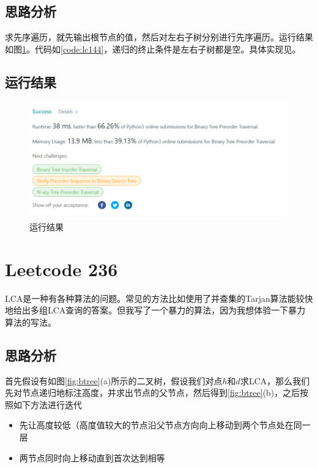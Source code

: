 \documentclass[a4paper,twoside]{article}
\begin{document}
\begin{spacing}{1.2}
\subsection{思路分析}

求先序遍历，就先输出根节点的值，然后对左右子树分别进行先序遍历。运行结果如图\ref{fig:lc144}。代码如\ref{code:lc144}，递归的终止条件是左右子树都是空。具体实现见。

\subsection{运行结果}

\begin{figure}[h]
	\centering
	\label{fig:lc144}
	\caption{运行结果}
	\includegraphics[width=0.8\linewidth]{lc144.png}
\end{figure}

\section{Leetcode 236}

LCA是一种有各种算法的问题。常见的方法比如使用了并查集的Tarjan算法能较快地给出多组LCA查询的答案。但我写了一个暴力的算法，因为我想体验一下暴力算法的写法。

\subsection{思路分析}

首先假设有如图\ref{fig:btree}(a)所示的二叉树，假设我们对点$h$和$d$求LCA，那么我们先对节点递归地标注高度，并求出节点的父节点，然后得到\ref{fig:btree}(b)，之后按照如下方法进行迭代

\begin{itemize}
	\item 先让高度较低（高度值较大的节点沿父节点方向向上移动到两个节点处在同一层
	\item 两节点同时向上移动直到首次达到相等
\end{itemize}


\end{spacing}
\end{document}
